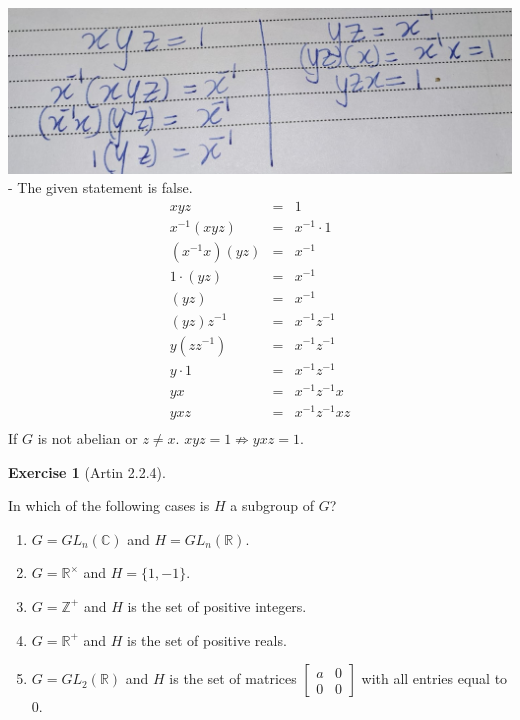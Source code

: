 \documentclass[
]{book}
\theoremstyle{definition}
\theoremstyle{definition}
\theoremstyle{definition}
\newtheorem{exercise}{Exercise}[chapter]
\theoremstyle{definition}
\theoremstyle{remark}
\begin{document}
\includegraphics{figures/ch_2/fig18.jpg}
- The given statement is false.
\begin{eqnarray}
          xyz&=&1\\
  x^{-1}(xyz)&=&x^{-1} \cdot 1\\
  (x^{-1}x)(yz)&=&x^{-1}\\
  1 \cdot(yz)&=&x^{-1}\\
  (yz)&=&x^{-1}\\
  (yz)z^{-1}&=&x^{-1}z^{-1}\\
  y(zz^{-1})&=&x^{-1}z^{-1}\\
  y \cdot 1&=&x^{-1}z^{-1}\\
  yx&=&x^{-1}z^{-1}x\\
  yxz&=&x^{-1}z^{-1}xz\\
\end{eqnarray}
If \(G\) is not abelian or \(z\neq x\). \(xyz=1 \nRightarrow yxz=1\).

\begin{exercise}[Artin 2.2.4]
\protect\hypertarget{exr:unnamed-chunk-73}{}\label{exr:unnamed-chunk-73}

In which of the following cases is \(H\) a subgroup of \(G\)?

\begin{enumerate}
\def\labelenumi{(\alph{enumi})}
\item
  \(G = GL_n(\mathbb{C})\) and \(H = GL_n(\mathbb{R})\).
\item
  \(G = \mathbb{R}^\times\) and \(H = \{1, -1\}\).
\item
  \(G = \mathbb{Z}^+\) and \(H\) is the set of positive integers.
\item
  \(G = \mathbb{R}^+\) and \(H\) is the set of positive reals.
\item
  \(G = GL_2(\mathbb{R})\) and \(H\) is the set of matrices \(\begin{bmatrix} a & 0 \\ 0 & 0 \end{bmatrix}\) with all entries equal to 0.
\end{enumerate}

\end{exercise}
\end{document}
